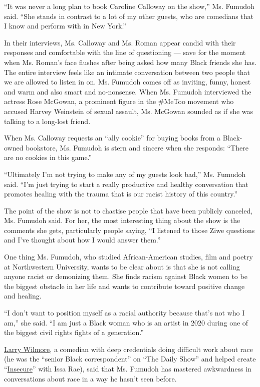 ``It was never a long plan to book Caroline Calloway on the show,'' Ms.
Fumudoh said. ``She stands in contrast to a lot of my other guests, who
are comedians that I know and perform with in New York.''

In their interviews, Ms. Calloway and Ms. Roman appear candid with their
responses and comfortable with the line of questioning --- save for the
moment when Ms. Roman's face flushes after being asked how many Black
friends she has. The entire interview feels like an intimate
conversation between two people that we are allowed to listen in on. Ms.
Fumudoh comes off as inviting, funny, honest and warm and also smart and
no-nonsense. When Ms. Fumudoh interviewed the actress Rose McGowan, a
prominent figure in the \#MeToo movement who accused Harvey Weinstein of
sexual assault, Ms. McGowan sounded as if she was talking to a long-lost
friend.

When Ms. Calloway requests an ``ally cookie'' for buying books from a
Black-owned bookstore, Ms. Fumudoh is stern and sincere when she
responds: ``There are no cookies in this game.''

``Ultimately I'm not trying to make any of my guests look bad,'' Ms.
Fumudoh said. ``I'm just trying to start a really productive and healthy
conversation that promotes healing with the trauma that is our racist
history of this country.''

The point of the show is not to chastise people that have been publicly
canceled, Ms. Fumudoh said. For her, the most interesting thing about
the show is the comments she gets, particularly people saying, ``I
listened to those Ziwe questions and I've thought about how I would
answer them.''

One thing Ms. Fumudoh, who studied African-American studies, film and
poetry at Northwestern University, wants to be clear about is that she
is not calling anyone racist or demonizing them. She finds racism
against Black women to be the biggest obstacle in her life and wants to
contribute toward positive change and healing.

``I don't want to position myself as a racial authority because that's
not who I am,'' she said. ``I am just a Black woman who is an artist in
2020 during one of the biggest civil rights fights of a generation.''

\href{https://www.nytimes.com/2016/11/29/arts/television/larry-wilmore-after-comedy-central-signs-deal-with-abc.html}{Larry
Wilmore}, a comedian with deep credentials doing difficult work about
race (he was the ``senior Black correspondent'' on ``The Daily Show''
and helped create ``\href{https://www.hbo.com/insecure}{Insecure}'' with
Issa Rae), said that Ms. Fumudoh has mastered awkwardness in
conversations about race in a way he hasn't seen before.

